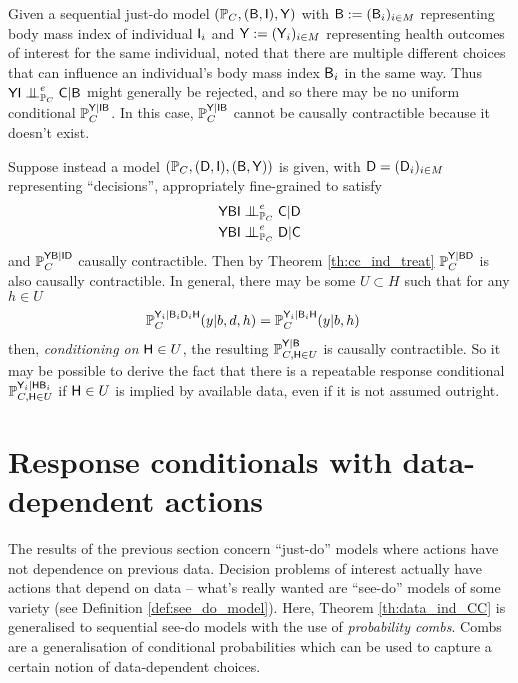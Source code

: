 Given a sequential just-do model $(\mathbb{P}_C,(\mathsf{B},\mathsf{I}),\mathsf{Y})$ with $\mathsf{B}:=(\mathsf{B}_i)_{i\in M}$ representing body mass index of individual $\mathsf{I}_i$ and $\mathsf{Y}:=(\mathsf{Y}_i)_{i\in M}$ representing health outcomes of interest for the same individual, \citet{hernan_does_2008} noted that there are multiple different choices that can influence an individual's body mass index $\mathsf{B}_i$ in the same way. Thus $\RV{YI}\CI^e_{\prob{P}_C} \RV{C}|\RV{B}$ might generally be rejected, and so there may be no uniform conditional $\mathbb{P}_C^{\mathsf{Y}|\mathsf{IB}}$. In this case, $\mathbb{P}_C^{\mathsf{Y}|\mathsf{IB}}$ cannot be causally contractible because it doesn't exist.

Suppose instead a model $(\mathbb{P}_C,(\mathsf{D},\mathsf{I}),(\mathsf{B},\mathsf{Y}))$ is given, with $\mathsf{D}=(\mathsf{D}_i)_{i\in M}$ representing ``decisions'', appropriately fine-grained to satisfy
\begin{align}
    &\RV{YBI}\CI^e_{\prob{P}_C} \RV{C}|\RV{D}\\
    &\RV{YBI}\CI^e_{\prob{P}_C} \RV{D}|\RV{C}
\end{align}
and $\mathbb{P}_C^{\mathsf{YB}|\mathsf{ID}}$ causally contractible. Then by Theorem \ref{th:cc_ind_treat} $\mathbb{P}_C^{\mathsf{Y}|\mathsf{BD}}$ is also causally contractible. In general, there may be some $U\subset H$ such that for any $h\in U$ 
\begin{align}
    \mathbb{P}_C^{\mathsf{Y}_i|\mathsf{B}_i\mathsf{D}_i\mathsf{H}}(y|b,d,h) &= \mathbb{P}_C^{\mathsf{Y}_i|\mathsf{B}_i\mathsf{H}}(y|b,h)\label{eq:conditional_conditional_independence}
\end{align}
then, \emph{conditioning on }$\mathsf{H}\in U$, the resulting $\mathbb{P}_{C,\mathsf{H}\in U}^{\mathsf{Y}|\mathsf{B}}$ is causally contractible.
So it may be possible to derive the fact that there is a repeatable response conditional $\mathbb{P}_{C,\mathsf{H}\in U}^{\mathsf{Y}_i|\mathsf{H}\mathsf{B}_i}$ if $\mathsf{H}\in U$ is implied by available data, even if it is not assumed outright.

\section{Response conditionals with data-dependent actions}\label{sec:data_dependent}

The results of the previous section concern ``just-do'' models where actions have not dependence on previous data. Decision problems of interest actually have actions that depend on data -- what's really wanted are ``see-do'' models of some variety (see Definition \ref{def:see_do_model}). Here, Theorem \ref{th:data_ind_CC} is generalised to sequential see-do models with the use of \emph{probability combs}. Combs are a generalisation of conditional probabilities which can be used to capture a certain notion of data-dependent choices.

